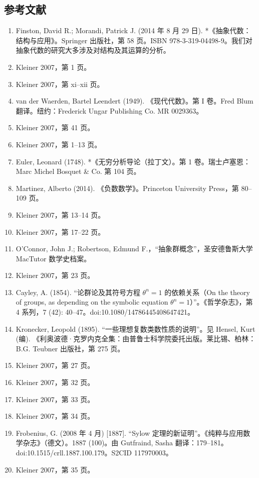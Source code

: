 \subsection{参考文献}
\begin{enumerate}
\item Finston, David R.; Morandi, Patrick J. (2014 年 8 月 29 日). *《抽象代数：结构与应用》。Springer 出版社，第 58 页。ISBN 978-3-319-04498-9。我们对抽象代数的研究大多涉及对结构及其运算的分析。
\item Kleiner 2007，第 1 页。
\item Kleiner 2007，第 xi–xii 页。
\item van der Waerden, Bartel Leendert (1949). 《现代代数》。第 I 卷。Fred Blum 翻译。纽约：Frederick Ungar Publishing Co. MR 0029363。
\item Kleiner 2007，第 41 页。
\item Kleiner 2007，第 1–13 页。
\item Euler, Leonard (1748). *《无穷分析导论（拉丁文）。第 1 卷。瑞士卢塞恩：Marc Michel Bosquet & Co. 第 104 页。
\item Martinez, Alberto (2014). 《负数数学》。Princeton University Press，第 80–109 页。
\item Kleiner 2007，第 13–14 页。
\item Kleiner 2007，第 17–22 页。
\item O'Connor, John J.; Robertson, Edmund F.，“抽象群概念”，圣安德鲁斯大学 MacTutor 数学史档案。
\item Kleiner 2007，第 23 页。
\item Cayley, A. (1854). “论群论及其符号方程 $\theta^n = 1$ 的依赖关系（On the theory of groups, as depending on the symbolic equation $\theta^n = 1$）”。《哲学杂志》，第 4 系列，7 (42): 40–47。doi:10.1080/14786445408647421。
\item Kronecker, Leopold (1895). “一些理想复数类数性质的说明”。见 Hensel, Kurt (编). 《利奥波德·克罗内克全集：由普鲁士科学院委托出版。莱比锡、柏林：B.G. Teubner 出版社，第 275 页。
\item Kleiner 2007，第 27 页。
\item Kleiner 2007，第 32 页。
\item Kleiner 2007，第 33 页。
\item Kleiner 2007，第 34 页。
\item Frobenius, G. (2008 年 4 月) [1887]. “Sylow 定理的新证明”。《纯粹与应用数学杂志》（德文）。1887 (100)。由 Gutfraind, Sasha 翻译：179–181。doi:10.1515/crll.1887.100.179。S2CID 117970003。
\item Kleiner 2007，第 35 页。

\end{enumerate}
